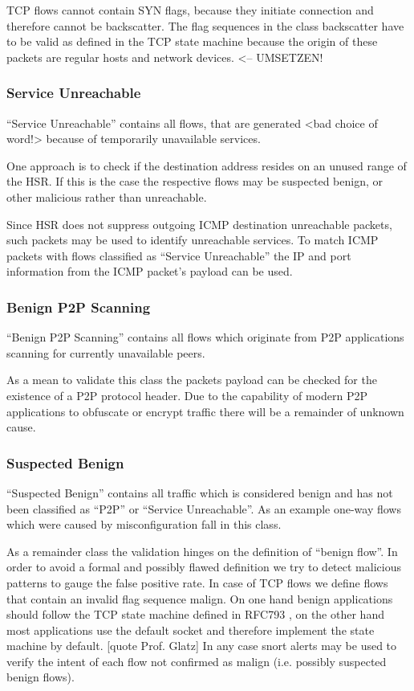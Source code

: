\documentclass[a4paper]{scrartcl}
\begin{document}
TCP flows cannot contain SYN flags, because they initiate connection and therefore cannot be backscatter. The flag sequences in the class backscatter have to be valid as defined in the TCP state machine \cite{rfc_tcp} because the origin of these packets are regular hosts and network devices. <-- UMSETZEN!

\subsubsection{Service Unreachable}
``Service Unreachable'' contains all flows, that are generated <bad choice of word!> because of temporarily unavailable services.

One approach is to check if the destination address resides on an unused range of the HSR. If this is the case the respective flows may be suspected benign, or other malicious rather than unreachable.

Since HSR does not suppress outgoing ICMP destination unreachable packets, such packets may be used to identify unreachable services. To match ICMP packets with flows classified as ``Service Unreachable'' the IP and port information from the ICMP packet's payload \cite{rfc_icmp} can be used. 

\subsubsection{Benign P2P Scanning}
``Benign P2P Scanning'' contains all flows which originate from P2P applications scanning for currently unavailable peers.

As a mean to validate this class the packets payload can be checked for the existence of a P2P protocol header. Due to the capability of modern P2P applications to obfuscate \cite{emule} or encrypt \cite{vuze} traffic there will be a remainder of unknown cause.

\subsubsection{Suspected Benign}
``Suspected Benign'' contains all traffic which is considered benign and has not been classified as ``P2P'' or ``Service Unreachable''. As an example one-way flows which were caused by misconfiguration fall in this class.

As a remainder class the validation hinges on the definition of ``benign flow''. 
In order to avoid a formal and possibly flawed definition we try to detect malicious patterns to gauge the false positive rate.
In case of TCP flows we define flows that contain an invalid flag sequence malign. On one hand benign applications should follow the TCP state machine defined in RFC793 \cite{rfc_tcp}, on the other hand most applications use the default socket and therefore implement the state machine by default. [quote Prof. Glatz]
In any case snort alerts may be used to verify the intent of each flow not confirmed as malign (i.e. possibly suspected benign flows).
\end{document}
